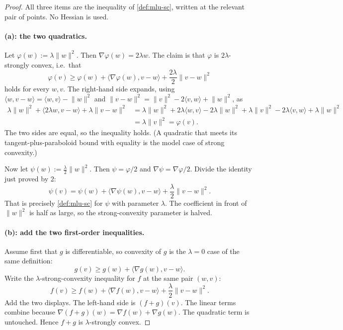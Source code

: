 \begin{proof}
All three items are the inequality of \cref{def:mlu-sc}, written at the relevant pair of points. No Hessian is used.

\paragraph{(a): the two quadratics.}
Let $\varphi(w):=\lambda\lVert w\rVert^2$. Then $\nabla\varphi(w)=2\lambda w$. The claim is that $\varphi$ is $2\lambda$-strongly convex, i.e.\ that
\[
\varphi(v)
\ge
\varphi(w)+\langle\nabla\varphi(w),v-w\rangle+\frac{2\lambda}{2}\lVert v-w\rVert^2
\]
holds for every $w,v$. The right-hand side expands, using $\langle w,v-w\rangle=\langle w,v\rangle-\lVert w\rVert^2$ and $\lVert v-w\rVert^2=\lVert v\rVert^2-2\langle v,w\rangle+\lVert w\rVert^2$, as
\begin{align*}
\lambda\lVert w\rVert^2+\langle 2\lambda w,v-w\rangle+\lambda\lVert v-w\rVert^2
&=
\lambda\lVert w\rVert^2+2\lambda\langle w,v\rangle-2\lambda\lVert w\rVert^2
+\lambda\lVert v\rVert^2-2\lambda\langle v,w\rangle+\lambda\lVert w\rVert^2 \\
&=
\lambda\lVert v\rVert^2
=
\varphi(v).
\end{align*}
The two sides are equal, so the inequality holds. (A quadratic that meets its tangent-plus-paraboloid bound with equality is the model case of strong convexity.)

Now let $\psi(w):=\tfrac{\lambda}{2}\lVert w\rVert^2$. Then $\psi=\varphi/2$ and $\nabla\psi=\nabla\varphi/2$. Divide the identity just proved by $2$:
\[
\psi(v)
=
\psi(w)+\langle\nabla\psi(w),v-w\rangle+\frac{\lambda}{2}\lVert v-w\rVert^2.
\]
That is precisely \cref{def:mlu-sc} for $\psi$ with parameter $\lambda$. The coefficient in front of $\lVert w\rVert^2$ is half as large, so the strong-convexity parameter is halved.

\paragraph{(b): add the two first-order inequalities.}
Assume first that $g$ is differentiable, so convexity of $g$ is the $\lambda=0$ case of the same definition:
\[
g(v)
\ge
g(w)+\langle\nabla g(w),v-w\rangle.
\]
Write the $\lambda$-strong-convexity inequality for $f$ at the same pair $(w,v)$:
\[
f(v)
\ge
f(w)+\langle\nabla f(w),v-w\rangle+\frac{\lambda}{2}\lVert v-w\rVert^2.
\]
Add the two displays. The left-hand side is $(f+g)(v)$. The linear terms combine because $\nabla(f+g)(w)=\nabla f(w)+\nabla g(w)$. The quadratic term is untouched. Hence $f+g$ is $\lambda$-strongly convex.


\end{proof}
